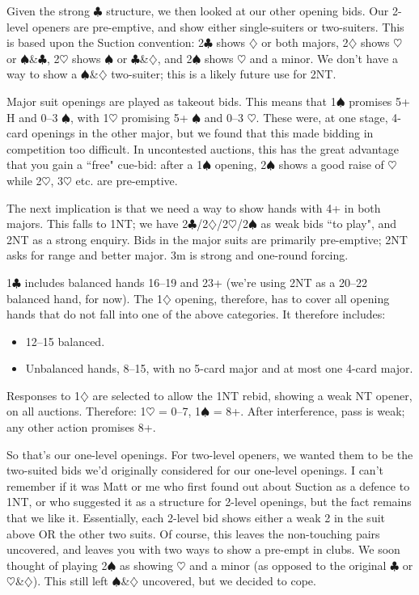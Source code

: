 \documentclass[a4paper,14pt]{extarticle}
\begin{document}
Given the strong $\clubsuit$ structure, we then looked at our other opening bids.  Our
2-level openers are pre-emptive, and show either single-suiters or two-suiters.
This is based upon the Suction convention: 2$\clubsuit$ shows $\diamondsuit$ or both majors, 2$\diamondsuit$ shows
$\heartsuit$ or $\spadesuit$\&$\clubsuit$, 2$\heartsuit$ shows $\spadesuit$ or $\clubsuit$\&$\diamondsuit$, and 2$\spadesuit$ shows $\heartsuit$ and a minor.  We don't have a way
to show a $\spadesuit$\&$\diamondsuit$ two-suiter; this is a likely future use for 2NT.

Major suit openings are played as takeout bids.  This means that 1$\spadesuit$ promises 5+
H and 0--3 $\spadesuit$, with 1$\heartsuit$ promising 5+ $\spadesuit$ and 0--3 $\heartsuit$.  These were, at one stage,
4-card openings in the other major, but we found that this made bidding in
competition too difficult.  In uncontested auctions, this has the great
advantage that you gain a ``free" cue-bid: after a 1$\spadesuit$ opening, 2$\spadesuit$ shows a good
raise of $\heartsuit$ while 2$\heartsuit$, 3$\heartsuit$ etc. are pre-emptive.

The next implication is that we need a way to show hands with 4+ in both
majors.  This falls to 1NT; we have 2$\clubsuit$/2$\diamondsuit$/2$\heartsuit$/2$\spadesuit$ as weak bids ``to play", and 2NT
as a strong enquiry.  Bids in the major suits are primarily pre-emptive; 2NT
asks for range and better major.  3m is strong and one-round forcing.

1$\clubsuit$ includes balanced hands 16--19 and 23+ (we're using 2NT as a 20--22 balanced
hand, for now).  The 1$\diamondsuit$ opening, therefore, has to cover all opening hands that
do not fall into one of the above categories.  It therefore includes:

\begin{itemize}
\item 12--15 balanced.
\item Unbalanced hands, 8--15, with no 5-card major and at most one 4-card
      major.
\end{itemize}

Responses to 1$\diamondsuit$ are selected to allow the 1NT rebid, showing a weak NT opener,
on all auctions.  Therefore: 1$\heartsuit$ = 0--7, 1$\spadesuit$ = 8+.  After interference, pass is
weak; any other action promises 8+.

So that's our one-level openings.  For two-level openers, we wanted them to be
the two-suited bids we'd originally considered for our one-level openings.  I
can't remember if it was Matt or me who first found out about Suction as a
defence to 1NT, or who suggested it as a structure for 2-level openings, but
the fact remains that we like it.  Essentially, each 2-level bid shows either a
weak 2 in the suit above OR the other two suits.  Of course, this leaves the
non-touching pairs uncovered, and leaves you with two ways to show a pre-empt
in clubs.  We soon thought of playing 2$\spadesuit$ as showing $\heartsuit$ and
a minor (as opposed to the original $\clubsuit$ or
		$\heartsuit$\&$\diamondsuit$).  This still left
$\spadesuit$\&$\diamondsuit$ uncovered, but we decided to cope.
\end{document}
